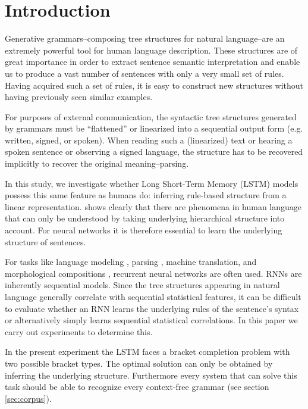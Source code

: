 \documentclass[11pt,a4paper]{article}
\begin{document}
\section{Introduction}

Generative grammars--composing tree structures for natural language--are an extremely powerful tool for human language description.  These structures are of great importance in order to extract sentence semantic interpretation\cite{berwick2016only} and enable us to produce a vast number of sentences with only a very small set of rules. Having acquired such a set of rules, it is easy to construct new structures without having previously seen similar examples.

For purposes of external communication, the syntactic tree structures generated by grammars must be ``flattened'' or linearized into a sequential output form (e.g. written, signed, or spoken). When reading such a (linearized) text or hearing a spoken sentence or observing a signed language, the structure has to be recovered implicitly to recover the original meaning--parsing.

In this study, we investigate whether Long Short-Term Memory (LSTM) models \cite{hochreiter1997long} possess this same feature as humans do: inferring rule-based structure from a linear representation. \citeauthor{everaert2015structures}  shows clearly that there are phenomena in human language that can only be understood by taking underlying hierarchical structure into account. For neural networks it is therefore essential to learn the underlying structure of sentences.

For tasks like language modeling \cite{mikolov2010recurrent, sundermeyer2012lstm}, parsing \cite{vinyals2015grammar, kiperwasser2016simple, dyer2016recurrent}, machine translation, \cite{bahdanau2014neural} and morphological compositions \cite{kim2016character}, recurrent neural networks are often used. RNNs are inherently sequential models. Since the tree structures appearing in natural language generally correlate with sequential statistical features, it can be difficult to evaluate whether an RNN learns the underlying rules of the sentence's syntax or alternatively simply learns sequential statistical correlations.  In this paper we carry out experiments to determine this.

In the present experiment the LSTM faces a bracket completion problem with two possible bracket types. The optimal solution can only be obtained by inferring the underlying structure. Furthermore every system that can solve this task should be able to recognize every context-free grammar (see section \ref{sec:corpus}).
\end{document}

